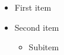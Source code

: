 \documentclass[aspectration=43]{beamer}
\begin{document}
\begin{frame}
  \begin{itemize}
  \item First item
  \item Second item
    \begin{itemize}
    \item Subitem
    \end{itemize}
  \end{itemize}
\end{frame}
\end{document}
